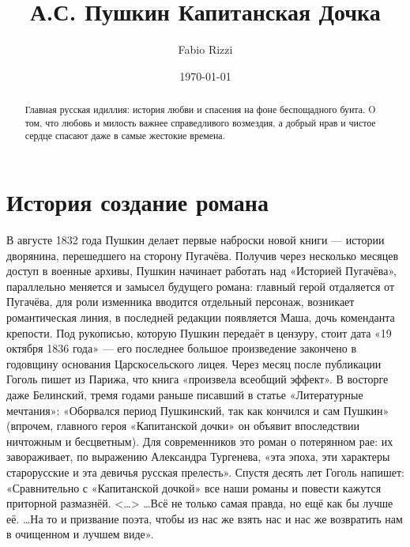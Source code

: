 \documentclass[a4paper,12pt]{article}
\author{Fabio Rizzi}
\title{А.С. Пушкин Капитанская Дочка}
\date{\today}
\begin{document}

\maketitle
\begin{abstract}
 Главная русская идиллия: история любви и спасения на фоне беспощадного бунта.
O том, что любовь и милость важнее справедливого возмездия, а добрый нрав и чистое сердце спасают даже в самые жестокие времена.
\end{abstract}
\tableofcontents %
\section{История создание романа}
В августе 1832 года Пушкин делает первые наброски новой книги — истории дворянина, перешедшего на сторону Пугачёва. Получив через несколько месяцев доступ в военные архивы, Пушкин начинает работать над «Историей Пугачёва», параллельно меняется и замысел будущего романа: главный герой отдаляется от Пугачёва, для роли изменника вводится отдельный персонаж, возникает романтическая линия, в последней редакции появляется Маша, дочь коменданта крепости. Под рукописью, которую Пушкин передаёт в цензуру, стоит дата «19 октября 1836 года» — его последнее большое произведение закончено в годовщину основания Царскосельского лицея. Через месяц после публикации Гоголь пишет из Парижа, что книга «произвела всеобщий эффект». В восторге даже Белинский, тремя годами раньше писавший в статье «Литературные мечтания»: «Оборвался период Пушкинский, так как кончился и сам Пушкин» (впрочем, главного героя «Капитанской дочки» он объявит впоследствии ничтожным и бесцветным). Для современников это роман о потерянном рае: их завораживает, по выражению Александра Тургенева, «эта эпоха, эти характеры старорусские и эта девичья русская прелесть». Спустя десять лет Гоголь напишет: «Сравнительно с «Капитанской дочкой» все наши романы и повести кажутся приторной размазнёй. <…> …Всё не только самая правда, но ещё как бы лучше её. …На то и призвание поэта, чтобы из нас же взять нас и нас же возвратить нам в очищенном и лучшем виде».
\end{document}
